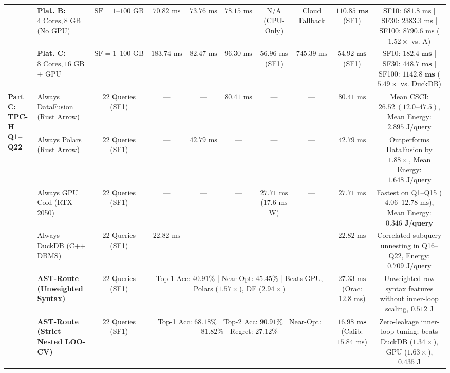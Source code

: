 \documentclass[10pt,a4paper]{article}
\begin{document}
\begin{table}[t!]
{\begin{tabular}{@{}llcccccccc@{}}
 & \textbf{Plat. B:} $4\text{ Cores}, 8\text{ GB}$ (No GPU) & $\text{SF}=1\text{--}100\text{ GB}$ & $70.82\text{ ms}$ & $73.76\text{ ms}$ & $78.15\text{ ms}$ & N/A (CPU-Only) & Cloud Fallback & $\mathbf{110.85\text{ ms}}$ (SF1) & SF10: $681.8\text{ ms}$ | SF30: $2383.3\text{ ms}$ | SF100: $8790.6\text{ ms}$ ($\mathbf{1.52\times}$ vs. A) \\
 & \textbf{Plat. C:} $8\text{ Cores}, 16\text{ GB}$ + GPU & $\text{SF}=1\text{--}100\text{ GB}$ & $183.74\text{ ms}$ & $82.47\text{ ms}$ & $96.30\text{ ms}$ & $56.96\text{ ms}$ (SF1) & $745.39\text{ ms}$ & $\mathbf{54.92\text{ ms}}$ (SF1) & SF10: $\mathbf{182.4\text{ ms}}$ | SF30: $\mathbf{448.7\text{ ms}}$ | SF100: $\mathbf{1142.8\text{ ms}}$ ($\mathbf{5.49\times}$ vs. DuckDB) \\
\midrule
\multirow{6}{*}{\textbf{Part C: TPC-H Q1--Q22}}
 & Always DataFusion (Rust Arrow) & $22$ Queries (SF1) & --- & --- & $80.41\text{ ms}$ & --- & --- & $80.41\text{ ms}$ & Mean CSCI: $26.52\ (12.0\text{--}47.5)$, Mean Energy: $2.895\text{ J/query}$ \\
 & Always Polars (Rust Arrow) & $22$ Queries (SF1) & --- & $42.79\text{ ms}$ & --- & --- & --- & $42.79\text{ ms}$ & Outperforms DataFusion by $1.88\times$, Mean Energy: $1.648\text{ J/query}$ \\
 & Always GPU Cold (RTX 2050) & $22$ Queries (SF1) & --- & --- & --- & $27.71\text{ ms}$ ($17.6\text{ ms}$ W) & --- & $27.71\text{ ms}$ & Fastest on Q1--Q15 ($4.06\text{--}12.78\text{ ms}$), Mean Energy: $\mathbf{0.346\text{ J/query}}$ \\
 & Always DuckDB (C++ DBMS) & $22$ Queries (SF1) & $22.82\text{ ms}$ & --- & --- & --- & --- & $22.82\text{ ms}$ & Correlated subquery unnesting in Q16--Q22, Energy: $0.709\text{ J/query}$ \\
 & \textbf{AST-Route (Unweighted Syntax)} & $22$ Queries (SF1) & \multicolumn{5}{c}{Top-1 Acc: $40.91\%$ | Near-Opt: $45.45\%$ | Beats GPU, Polars ($1.57\times$), DF ($2.94\times$)} & $27.33\text{ ms}$ (Orac: $12.8\text{ ms}$) & Unweighted raw syntax features without inner-loop scaling, $0.512\text{ J}$ \\
 & \textbf{AST-Route (Strict Nested LOO-CV)} & $22$ Queries (SF1) & \multicolumn{5}{c}{Top-1 Acc: $\mathbf{68.18\%}$ | Top-2 Acc: $\mathbf{90.91\%}$ | Near-Opt: $\mathbf{81.82\%}$ | Regret: $\mathbf{27.12\%}$} & $\mathbf{16.98\text{ ms}}$ (Calib: $15.84\text{ ms}$) & Zero-leakage inner-loop tuning; beats DuckDB ($1.34\times$), GPU ($1.63\times$), $0.435\text{ J}$ \\

\end{tabular}}
\end{table}
\end{document}
